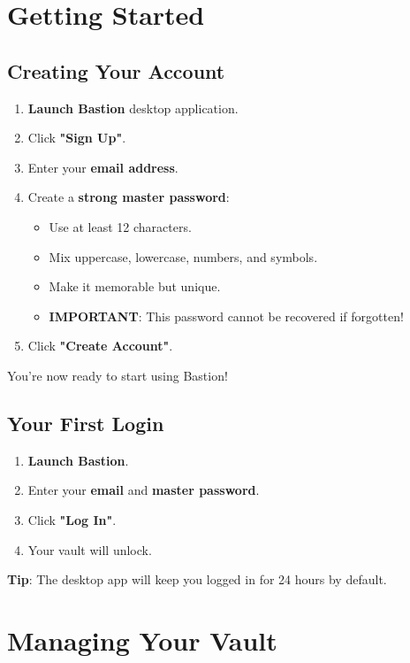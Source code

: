 \documentclass[11pt,a4paper]{article}
\begin{document}
\section{Getting Started}

\subsection{Creating Your Account}
\begin{enumerate}
    \item \textbf{Launch Bastion} desktop application.
    \item Click \textbf{"Sign Up"}.
    \item Enter your \textbf{email address}.
    \item Create a \textbf{strong master password}:
    \begin{itemize}
        \item Use at least 12 characters.
        \item Mix uppercase, lowercase, numbers, and symbols.
        \item Make it memorable but unique.
        \item \textbf{IMPORTANT}: This password cannot be recovered if forgotten!
    \end{itemize}
    \item Click \textbf{"Create Account"}.
\end{enumerate}
You're now ready to start using Bastion!

\subsection{Your First Login}
\begin{enumerate}
    \item \textbf{Launch Bastion}.
    \item Enter your \textbf{email} and \textbf{master password}.
    \item Click \textbf{"Log In"}.
    \item Your vault will unlock.
\end{enumerate}
\textbf{Tip}: The desktop app will keep you logged in for 24 hours by default.

\section{Managing Your Vault}
\end{document}
